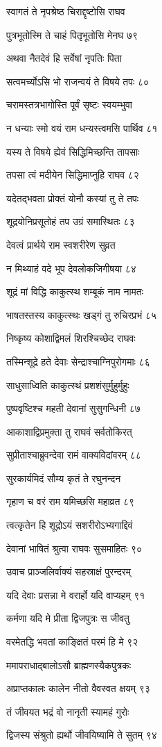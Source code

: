 स्वागतं ते नृपश्रेष्ठ चिराद्दृष्टोसि राघव

पुत्रभूतोस्मि ते चाहं पितृभूतोसि मेनघ ७९

अथवा नैतदेवं हि सर्वेषां नृपतिः पिता

सत्वमर्च्योऽसि भो राजन्वयं ते विषये तपः ८०

चरामस्तत्रभागोस्ति पूर्वं सृष्टः स्वयम्भुवा

न धन्याः स्मो वयं राम धन्यस्त्वमसि पार्थिव ८१

यस्य ते विषये ह्येवं सिद्धिमिच्छन्ति तापसाः

तपसा त्वं मदीयेन सिद्धिमाप्नुहि राघव ८२

यदेतद्भवता प्रोक्तं योनौ कस्यां तु ते तपः

शूद्रयोनिप्रसूतोहं तप उग्रं समास्थितः ८३

देवत्वं प्रार्थये राम स्वशरीरेण सुव्रत

न मिथ्याहं वदे भूप देवलोकजिगीषया ८४

शूद्रं मां विद्धि काकुत्स्थ शम्बूकं नाम नामतः

भाषतस्तस्य काकुत्स्थः खड्गं तु रुचिरप्रभं ८५

निष्कृष्य कोशाद्विमलं शिरश्चिच्छेद राघवः

तस्मिन्शूद्रे हते देवाः सेन्द्राश्चाग्निपुरोगमाः ८६

साधुसाध्विति काकुत्स्थं प्रशशंसुर्मुहुर्मुहुः

पुष्पवृष्टिश्च महती देवानां सुसुगन्धिनी ८७

आकाशाद्विप्रमुक्ता तु राघवं सर्वतोकिरत्

सुप्रीताश्चाब्रुवन्देवा रामं वाक्यविदांवरम् ८८

सुरकार्यमिदं सौम्य कृतं ते रघुनन्दन

गृहाण च वरं राम यमिच्छसि महाव्रत ८९

त्वत्कृतेन हि शूद्रोऽयं सशरीरोऽभ्यगाद्दिवं

देवानां भाषितं श्रुत्वा राघवः सुसमाहितः ९०

उवाच प्राञ्जलिर्वाक्यं सहस्राक्षं पुरन्दरम्

यदि देवाः प्रसन्ना मे वरार्हो यदि वाप्यहम् ९१

कर्मणा यदि मे प्रीता द्विजपुत्रः स जीवतु

वरमेतद्धि भवतां काङ्क्षितं परमं हि मे ९२

ममापराधाद्बालोऽसौ ब्राह्मणस्यैकपुत्रकः

अप्राप्तकालः कालेन नीतो वैवस्वत क्षयम् ९३

तं जीवयत भद्रं वो नानृती स्यामहं गुरोः

द्विजस्य संश्रुतो ह्यर्थो जीवयिष्यामि ते सुतम् ९४

